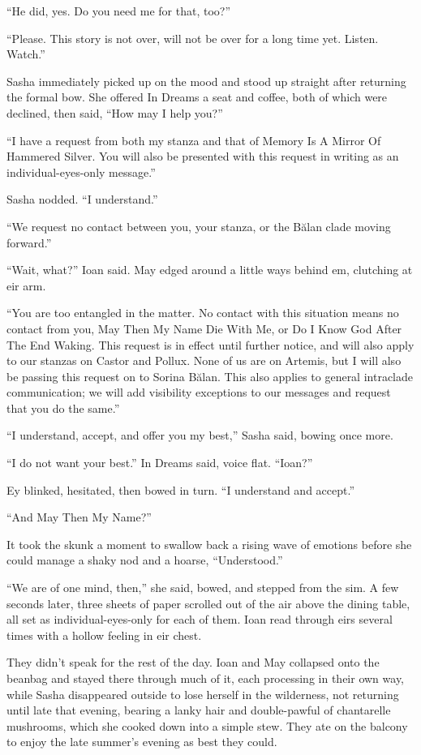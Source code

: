 ``He did, yes. Do you need me for that, too?''

``Please. This story is not over, will not be over for a long time yet. Listen. Watch.''

Sasha immediately picked up on the mood and stood up straight after returning the formal bow. She offered In Dreams a seat and coffee, both of which were declined, then said, ``How may I help you?''

``I have a request from both my stanza and that of Memory Is A Mirror Of Hammered Silver. You will also be presented with this request in writing as an individual-eyes-only message.''

Sasha nodded. ``I understand.''

``We request no contact between you, your stanza, or the Bălan clade moving forward.''

``Wait, what?'' Ioan said. May edged around a little ways behind em, clutching at eir arm.

``You are too entangled in the matter. No contact with this situation means no contact from you, May Then My Name Die With Me, or Do I Know God After The End Waking. This request is in effect until further notice, and will also apply to our stanzas on Castor and Pollux. None of us are on Artemis, but I will also be passing this request on to Sorina Bălan. This also applies to general intraclade communication; we will add visibility exceptions to our messages and request that you do the same.''

``I understand, accept, and offer you my best,'' Sasha said, bowing once more.

``I do not want your best.'' In Dreams said, voice flat. ``Ioan?''

Ey blinked, hesitated, then bowed in turn. ``I understand and accept.''

``And May Then My Name?''

It took the skunk a moment to swallow back a rising wave of emotions before she could manage a shaky nod and a hoarse, ``Understood.''

``We are of one mind, then,'' she said, bowed, and stepped from the sim. A few seconds later, three sheets of paper scrolled out of the air above the dining table, all set as individual-eyes-only for each of them. Ioan read through eirs several times with a hollow feeling in eir chest.

They didn't speak for the rest of the day. Ioan and May collapsed onto the beanbag and stayed there through much of it, each processing in their own way, while Sasha disappeared outside to lose herself in the wilderness, not returning until late that evening, bearing a lanky hair and double-pawful of chantarelle mushrooms, which she cooked down into a simple stew. They ate on the balcony to enjoy the late summer's evening as best they could.

